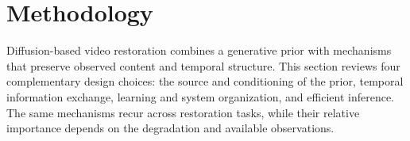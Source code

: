 \documentclass[journal]{IEEEtran}
\begin{document}
\section{Methodology}
\label{sec:methodology}
Diffusion-based video restoration combines a generative prior with mechanisms that preserve observed content and temporal structure. This section reviews four complementary design choices: the source and conditioning of the prior, temporal information exchange, learning and system organization, and efficient inference. The same mechanisms recur across restoration tasks, while their relative importance depends on the degradation and available observations.









\end{document}
